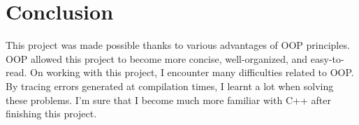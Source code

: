 \documentclass{article}
\begin{document}
\section{Conclusion}
This project was made possible thanks to various advantages of OOP principles. OOP allowed this project to become more concise, well-organized, and easy-to-read. On working with this project, I encounter many difficulties related to OOP. By tracing errors generated at compilation times, I learnt a lot when solving these problems. I'm sure that I become much more familiar with C++ after finishing this project.
\end{document}
